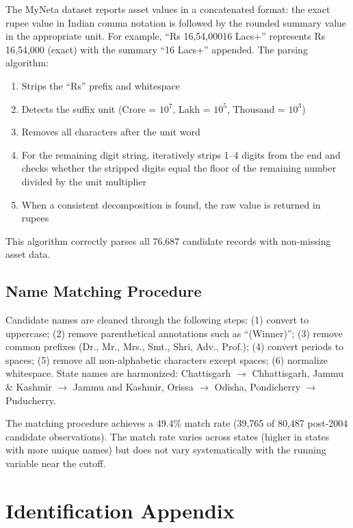 \documentclass[12pt]{article}
\begin{document}
The MyNeta dataset reports asset values in a concatenated format: the exact rupee value in Indian comma notation is followed by the rounded summary value in the appropriate unit. For example, ``Rs 16,54,00016 Lacs+'' represents Rs 16,54,000 (exact) with the summary ``16 Lacs+'' appended. The parsing algorithm:

\begin{enumerate}
\item Strips the ``Rs'' prefix and whitespace
\item Detects the suffix unit (Crore = $10^7$, Lakh = $10^5$, Thousand = $10^3$)
\item Removes all characters after the unit word
\item For the remaining digit string, iteratively strips 1--4 digits from the end and checks whether the stripped digits equal the floor of the remaining number divided by the unit multiplier
\item When a consistent decomposition is found, the raw value is returned in rupees
\end{enumerate}

This algorithm correctly parses all 76,687 candidate records with non-missing asset data.

\subsection{Name Matching Procedure}

Candidate names are cleaned through the following steps: (1) convert to uppercase; (2) remove parenthetical annotations such as ``(Winner)''; (3) remove common prefixes (Dr., Mr., Mrs., Smt., Shri, Adv., Prof.); (4) convert periods to spaces; (5) remove all non-alphabetic characters except spaces; (6) normalize whitespace. State names are harmonized: Chattisgarh $\rightarrow$ Chhattisgarh, Jammu \& Kashmir $\rightarrow$ Jammu and Kashmir, Orissa $\rightarrow$ Odisha, Pondicherry $\rightarrow$ Puducherry.

The matching procedure achieves a 49.4\% match rate (39,765 of 80,487 post-2004 candidate observations). The match rate varies across states (higher in states with more unique names) but does not vary systematically with the running variable near the cutoff.


\section{Identification Appendix}
\end{document}
